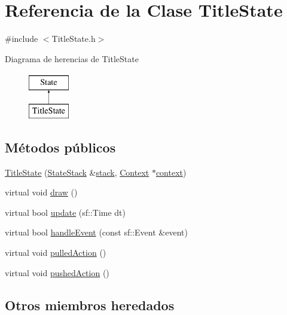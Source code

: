 \hypertarget{classTitleState}{}\section{Referencia de la Clase Title\+State}
\label{classTitleState}


{\ttfamily \#include $<$Title\+State.\+h$>$}

Diagrama de herencias de Title\+State\begin{figure}[H]
\begin{center}
\leavevmode
\includegraphics[height=2.000000cm]{classTitleState}
\end{center}
\end{figure}
\subsection*{Métodos públicos}
\begin{DoxyCompactItemize}
\item 
\hyperlink{classTitleState_af8f9f14886d8dbfd7c6167dcc4d3aeaf}{Title\+State} (\hyperlink{classStateStack}{State\+Stack} \&\hyperlink{classState_a86c8d3a5a1ee89896828be85a785fb04}{stack}, \hyperlink{classContext}{Context} $\ast$\hyperlink{classState_adc93e8ad3199b5891618ca88eed0436a}{context})
\item 
virtual void \hyperlink{classTitleState_ae12beafe5aad6929a56089942de1220e}{draw} ()
\item 
virtual bool \hyperlink{classTitleState_aa282ac0c6e22267cb6a7054973d75fdf}{update} (sf\+::\+Time dt)
\item 
virtual bool \hyperlink{classTitleState_a91c6ab4d741fe7445d88ed603001971a}{handle\+Event} (const sf\+::\+Event \&event)
\item 
virtual void \hyperlink{classTitleState_ab27a65d03920cbbb9cff7f14cd23372c}{pulled\+Action} ()
\item 
virtual void \hyperlink{classTitleState_a6c10b4a33cf09388f0bcca1af0872f68}{pushed\+Action} ()
\end{DoxyCompactItemize}
\subsection*{Otros miembros heredados}


